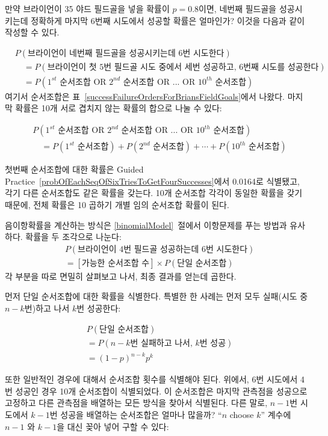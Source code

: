 만약 브라이언이 35 야드 필드골을 넣을 확률이 $p=0.8$이면, 네번째 필드골을 성공시키는데 정확하게 마지막 6번째 시도에서 성공할 확률은 얼마인가? 이것을 다음과 같이 작성할 수 있다.

{\small\begin{align*}
&P(\text{브라이언이 네번째 필드골을 성공시키는데 6번 시도한다}) \\
& \quad = P(\text{브라이언이 첫 5번 필드골 시도 중에서 세번 성공하고, 6번째 시도를 성공한다}) \\
& \quad = P(\text{$1^{st}$ 순서조합 OR $2^{nd}$ 순서조합 OR ... OR $10^{th}$ 순서조합})
\end{align*}
}
여기서 순서조합은 표~\ref{successFailureOrdersForBriansFieldGoals}에서 나왔다. 마지막 확률은 10개 서로 겹치지 않는 확률의 합으로 나눌 수 있다:

{\small\begin{align*}
&P(\text{$1^{st}$ 순서조합 OR $2^{nd}$ 순서조합 OR ... OR $10^{th}$ 순서조합}) \\
&\quad = P(\text{$1^{st}$ 순서조합}) + P(\text{$2^{nd}$ 순서조합}) + \cdots + P(\text{$10^{th}$ 순서조합})
\end{align*}
}

첫번째 순서조합에 대한 확률은 Guided Practice~\ref{probOfEachSeqOfSixTriesToGetFourSuccesses}에서 0.0164로 식별됐고, 각기 다른 순서조합도 같은 확률을 갖는다. 10개 순서조합 각각이 동일한 확률을 갖기 때문에, 전체 확률은 10 곱하기 개별 임의 순서조합 확률이 된다.

음이항확률을 계산하는 방식은 \ref{binomialModel}~절에서 이항문제를 푸는 방법과 유사하다. 확률을 두 조각으로 나눈다:
\begin{align*}
&P(\text{브라이언이 4번 필드골 성공하는데 6번 시도한다}) \\
&= [\text{가능한 순서조합 수}] \times P(\text{단일 순서조합})
\end{align*}
각 부분을 따로 면밀히 살펴보고 나서, 최종 결과를 얻는데 곱한다.

먼저 단일 순서조합에 대한 확률을 식별한다. 특별한 한 사례는 먼저 모두 실패(시도 중 $n-k$번)하고 나서 $k$번 성공한다:

\begin{align*}
&P(\text{단일 순서조합}) \\
&= P(\text{$n-k$번 실패하고 나서, $k$번 성공}) \\
&= (1-p)^{n-k} p^{k}
\end{align*}

또한 일반적인 경우에 대해서 순서조합 횟수를 식별해야 된다. 위에서, 6번 시도에서 4번 성공인 경우 10개 순서조합이 식별되었다. 이 순서조합은 마지막 관측점을 성공으로 고정하고 다른 관측점을 배열하는 모든 방식을 찾아서 식별된다. 다른 말로, $n-1$번 시도에서 $k-1$번 성공을 배열하는 순서조합은 얼마나 많을까? ``$n$ choose $k$'' 계수에  $n-1$ 와 $k-1$을 대신 꽂아 넣어 구할 수 있다:


